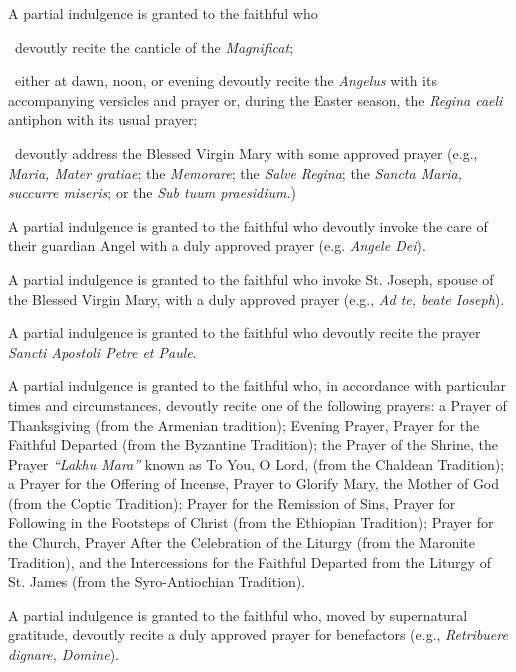 \documentclass[12pt]{article}
\newcommand{\foreign}[1]{\textsl{#1}}
\begin{document}
 A partial indulgence is granted to the faithful who

 devoutly recite the canticle of the \foreign{Magnificat};

 either at dawn, noon, or evening devoutly recite the \foreign{Angelus} with its accompanying versicles and prayer or, during the Easter season, the \foreign{Regina caeli} antiphon with its usual prayer;

 devoutly address the Blessed Virgin Mary with some approved prayer (e.g., \foreign{Maria, Mater gratiae}; the \foreign{Memorare}; the \foreign{Salve Regina}; the \foreign{Sancta Maria, succurre miseris}; or the \foreign{Sub tuum praesidium}.)

\hypertarget{grant18}{}
A partial indulgence is granted to the faithful who devoutly invoke the care of their guardian Angel with a duly approved prayer (e.g. \foreign{Angele Dei}).

\hypertarget{grant19}{}
A partial indulgence is granted to the faithful who invoke St. Joseph, spouse of the Blessed Virgin Mary, with a duly approved prayer (e.g., \foreign{Ad te, beate Ioseph}).

\hypertarget{grant20}{}
A partial indulgence is granted to the faithful who devoutly recite the prayer \foreign{Sancti Apostoli Petre et Paule}.

\hypertarget{grant23}{}
 A partial indulgence is granted to the faithful who, in accordance with particular times and circumstances, devoutly recite one of the following prayers: a Prayer of Thanksgiving (from the Armenian tradition); Evening Prayer, Prayer for the Faithful Departed (from the Byzantine Tradition); the Prayer of the Shrine, the Prayer \foreign{``Lakhu Mara''} known as To You, O Lord, (from the Chaldean Tradition); a Prayer for the Offering of Incense, Prayer to Glorify Mary, the Mother of God (from the Coptic Tradition); Prayer for the Remission of Sins, Prayer for Following in the Footsteps of Christ (from the Ethiopian Tradition); Prayer for the Church, Prayer After the Celebration of the Liturgy (from the Maronite Tradition), and the Intercessions for the Faithful Departed from the Liturgy of St. James (from the Syro-Antiochian Tradition).

\hypertarget{grant24}{}
A partial indulgence is granted to the faithful who, moved by supernatural gratitude, devoutly recite a duly approved prayer for benefactors (e.g., \foreign{Retribuere dignare, Domine}).
\end{document}
